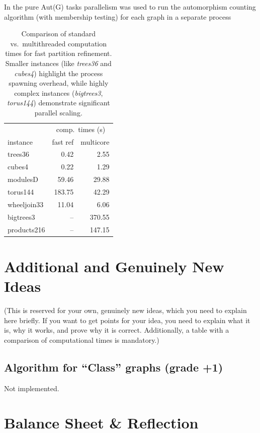 \documentclass[twoside]{article}
\begin{document}
In the pure Aut(G) tasks parallelism was used to run the automorphism counting algorithm (with membership testing) for each graph in a separate process
\begin{table}[H]
\centering
\begin{tabular}{l|r|r}
& \multicolumn{2}{c}{comp.\ times (s)}\\
instance & fast ref & multicore \\
\noalign{\smallskip}\hline\hline\noalign{\smallskip}
trees36      & 0.42   & 2.55   \\
cubes4       & 0.22   & 1.29   \\
modulesD     & 59.46  & 29.88  \\
torus144     & 183.75 & 42.29  \\
wheeljoin33  & 11.04  & 6.06   \\
bigtrees3    & --     & 370.55 \\
products216  & --     & 147.15 \\
\end{tabular}
\caption{Comparison of standard vs.\ multithreaded computation times for fast partition refinement. Smaller instances (like \emph{trees36} and \emph{cubes4}) highlight the process spawning overhead, while highly complex instances (\emph{bigtrees3}, \emph{torus144}) demonstrate significant parallel scaling.}
\label{tab:multithreading_comparison}
\end{table}

\section{Additional and Genuinely New Ideas}

(This is reserved for your own, genuinely new ideas, which you need to explain here briefly. If you want to get points for your idea, you need to
explain what it is, why it works, and prove why it is correct. Additionally,
a table with a comparison of computational times is mandatory.)

\subsection{Algorithm for ``Class'' graphs (grade +1)}
Not implemented.

\section{Balance Sheet \& Reflection}
\end{document}
